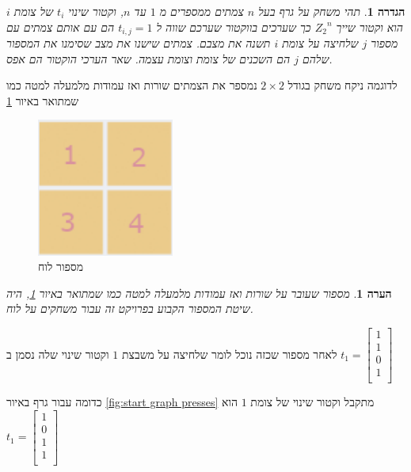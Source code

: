 \documentclass[12pt,leqno]{article}
\newtheorem{definition}{הגדרה}[section]
\newtheorem{comm}{הערה}[section]
\newcommand{\Zn}{{Z_2}^n}
\begin{document}
\newpage

\begin{definition}
    תהי 
    משחק על גרף בעל
    $n$
    צמתים
    ממספרים מ
    $1$
    עד
    $n$,
    וקטור שינוי
    $t_i$
    של צומת  
    $i$
    הוא 
    וקטור 
    שייך 
    $\Zn$
    כך
    שערכים בווקטור 
    שערכם שווה ל
    $t_{i,j} = 1$
    הם עם אותם 
    צמתים 
    עם מספור 
    $j$
    שלחיצה על צומת
    $i$
    תשנה את מצבם.
    צמתים שישנו את מצב 
    שסימנו את המספור שלהם
    $j$
    הם השכנים של צומת
    וצומת עצמה.
    שאר הערכי הוקטור הם אפס.
\end{definition}

לדוגמה ניקח 
משחק בגודל
$2 \times 2$
נמספר את הצמתים 
שורות ואז עמודות מלמעלה למטה כמו שמתואר באיור
\ref{fig:numbering_board_2x2}

\begin{figure}[ht]
    \caption{מספור לוח}
    \label{fig:numbering_board_2x2}
    \centering
    \includegraphics[width=0.4\textwidth,keepaspectratio]{images/numbering_board_2x2.PNG}
\end{figure}

\begin{comm}
    \label{ comm: indexing board game}
    מספור שעובר על שורות ואז עמודות מלמעלה למטה כמו שמתואר באיור
    \ref{fig:numbering_board_2x2},
     היה שיטת המספור הקבוע בפרויקט זה עבור משחקים על לוח.
\end{comm}

לאחר מספור שכזה נוכל לומר שלחיצה על משבצת 
$1$
וקטור שינוי שלה נסמן ב
$
    t_1 = 
    \begin{bmatrix}
        1 \\
        1 \\
        0 \\
        1 \\
    \end{bmatrix}
$

כדומה
עבור גרף באיור
\ref{fig:start graph presses}
מתקבל וקטור שינוי של צומת 
$1$
הוא
$
    t_1 = 
    \begin{bmatrix}
        1 \\
        0 \\
        1 \\
        1 \\
    \end{bmatrix}
$
\end{document}
